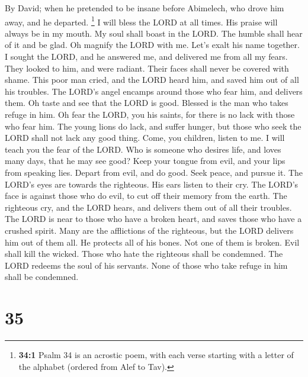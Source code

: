 By David; when he pretended to be insane before Abimelech, who drove him
away, and he departed.  \footnote{\textbf{34:1} Psalm 34
  is an acrostic poem, with each verse starting with a letter of the
  alphabet (ordered from Alef to Tav).} I will bless the LORD at all
times. His praise will always be in my mouth.  My soul
shall boast in the LORD. The humble shall hear of it and be glad.
 Oh magnify the LORD with me. Let's exalt his name
together.  I sought the LORD, and he answered me, and
delivered me from all my fears.  They looked to him, and
were radiant. Their faces shall never be covered with shame.
 This poor man cried, and the LORD heard him, and saved
him out of all his troubles.  The LORD's angel encamps
around those who fear him, and delivers them.  Oh taste
and see that the LORD is good. Blessed is the man who takes refuge in
him.  Oh fear the LORD, you his saints, for there is no
lack with those who fear him.  The young lions do lack,
and suffer hunger, but those who seek the LORD shall not lack any good
thing.  Come, you children, listen to me. I will teach
you the fear of the LORD.  Who is someone who desires
life, and loves many days, that he may see good?  Keep
your tongue from evil, and your lips from speaking lies. 
Depart from evil, and do good. Seek peace, and pursue it.
 The LORD's eyes are towards the righteous. His ears
listen to their cry.  The LORD's face is against those
who do evil, to cut off their memory from the earth.  The
righteous cry, and the LORD hears, and delivers them out of all their
troubles.  The LORD is near to those who have a broken
heart, and saves those who have a crushed spirit.  Many
are the afflictions of the righteous, but the LORD delivers him out of
them all.  He protects all of his bones. Not one of them
is broken.  Evil shall kill the wicked. Those who hate
the righteous shall be condemned.  The LORD redeems the
soul of his servants. None of those who take refuge in him shall be
condemned.

\hypertarget{section-34}{%
\section{35}\label{section-34}}

